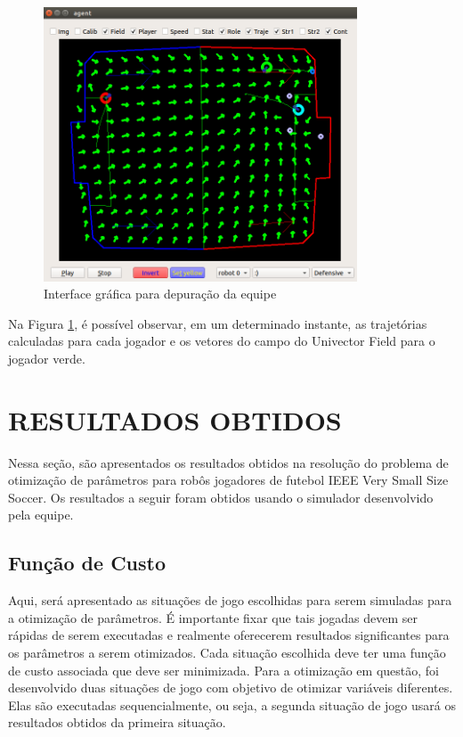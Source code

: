 \documentclass[10pt,fleqn,a4paper]{article}
\begin{document}
\begin{figure}[H]
	\centering
	\includegraphics[width=0.83\textwidth]{figures/UnivectorFieldSimulatorDebugger.png}
	\caption{Interface gráfica para depuração da equipe}
	\label{fig:univector}
\end{figure}

Na Figura \ref{fig:univector}, é possível observar, em um determinado instante, as trajetórias calculadas para cada jogador e os vetores do campo do Univector Field para o jogador verde.


    \section{RESULTADOS OBTIDOS}
Nessa seção, são apresentados os resultados obtidos na resolução do problema de otimização de parâmetros para robôs jogadores de futebol IEEE Very Small Size Soccer. Os resultados a seguir foram obtidos usando o simulador desenvolvido pela equipe.

\subsection{Função de Custo}

Aqui, será apresentado as situações de jogo escolhidas para serem simuladas para a otimização de parâmetros. É importante fixar que tais jogadas devem ser rápidas de serem executadas e realmente oferecerem resultados significantes para os parâmetros a serem otimizados. Cada situação escolhida deve ter uma função de custo associada que deve ser minimizada.
Para a otimização em questão, foi desenvolvido duas situações de jogo com objetivo de otimizar variáveis diferentes. Elas são executadas sequencialmente, ou seja, a segunda situação de jogo usará os resultados obtidos da primeira situação.
\end{document}
